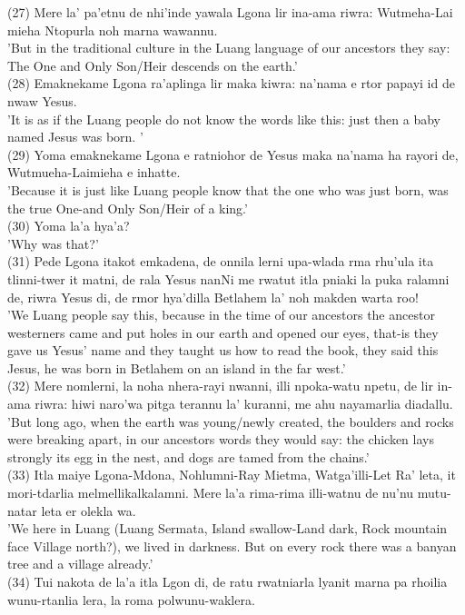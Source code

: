 \documentclass[10pt]{article}
\begin{document}
(27) Mere la' pa'etnu de nhi'inde yawala Lgona lir ina-ama riwra: Wutmeha-Lai mieha Ntopurla noh marna wawannu.\\
'But in the traditional culture in the Luang language of our ancestors they say: The One and Only Son/Heir descends on the earth.'\\
(28) Emaknekame Lgona ra'aplinga lir maka kiwra: na'nama e rtor papayi id de nwaw Yesus.\\
'It is as if the Luang people do not know the words like this: just then a baby named Jesus was born. '\\
(29) Yoma emaknekame Lgona e ratniohor de Yesus maka na'nama ha rayori de, Wutmueha-Laimieha e inhatte.\\
'Because it is just like Luang people know that the one who was just born, was the true One-and Only Son/Heir of a king.'\\
(30) Yoma la'a hya'a?\\
'Why was that?'\\
(31) Pede Lgona itakot emkadena, de onnila lerni upa-wlada rma rhu'ula ita tlinni-twer it matni, de rala Yesus nanNi me rwatut itla pniaki la puka ralamni de, riwra Yesus di, de rmor hya'dilla Betlahem la' noh makden warta roo!\\
'We Luang people say this, because in the time of our ancestors the ancestor westerners came and put holes in our earth and opened our eyes, that-is they gave us Yesus' name and they taught us how to read the book, they said this Jesus, he was born in Betlahem on an island in the far west.'\\
(32) Mere nomlerni, la noha nhera-rayi nwanni, illi npoka-watu npetu, de lir in-ama riwra: hiwi naro'wa pitga terannu la' kuranni, me ahu nayamarlia diadallu.\\
'But long ago, when the earth was young/newly created, the boulders and rocks were breaking apart, in our ancestors words they would say: the chicken lays strongly its egg in the nest, and dogs are tamed from the chains.'\\
(33) Itla maiye Lgona-Mdona, Nohlumni-Ray Mietma, Watga'illi-Let Ra' leta, it mori-tdarlia melmellikalkalamni. Mere la'a rima-rima illi-watnu de nu'nu mutu-natar leta er olekla wa.\\
'We here in Luang (Luang Sermata, Island swallow-Land dark, Rock mountain face Village north?), we lived in darkness. But on every rock there was a banyan tree and a village already.'\\
(34) Tui nakota de la'a itla Lgon di, de ratu rwatniarla lyanit marna pa rhoilia wunu-rtanlia lera, la roma polwunu-waklera.\\
\end{document}
